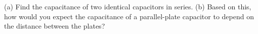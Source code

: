 (a) Find the capacitance of two identical capacitors in
        series. \hwendpart
        (b) Based on this, how would you expect the
        capacitance of a parallel-plate capacitor to depend on the
        distance between the plates?
